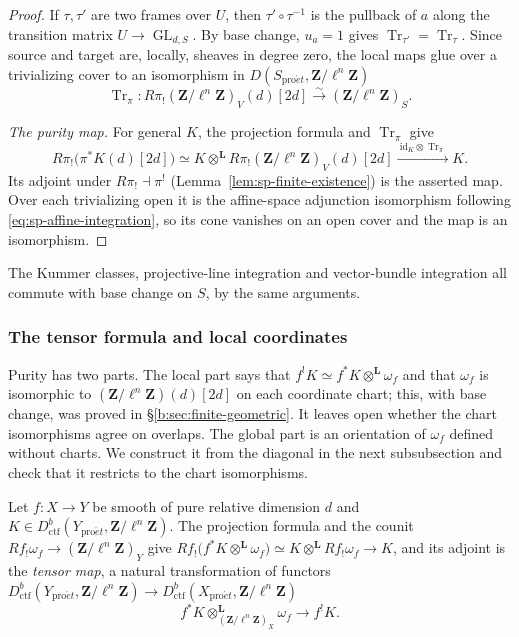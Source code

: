 \documentclass[11pt,a4paper]{article}
\numberwithin{equation}{section}
\theoremstyle{definition}
\theoremstyle{remark}
\newcommand{\proet}{\mathrm{pro}\acute{e}t}
\newcommand{\Dctf}{D^b_{\mathrm{ctf}}}
\DeclareMathOperator{\GL}{GL}
\begin{document}
\begin{proof}
If $\tau,\tau'$ are two frames over $U$, then $\tau'\circ\tau^{-1}$ is
the pullback of $a$ along the transition matrix $U\to\GL_{d,S}$. By
base change, $u_a=1$ gives $\operatorname{Tr}_{\tau'}=\operatorname{Tr}_{\tau}$.
Since source and target are, locally, sheaves in degree zero, the
local maps glue over a trivializing cover to an isomorphism in
$D(S_{\proet},\mathbf Z/\ell^n\mathbf Z)$
\[
 \operatorname{Tr}_{\pi}:
 R\pi_!(\mathbf Z/\ell^n\mathbf Z)_V(d)[2d]
       \xrightarrow{\sim}(\mathbf Z/\ell^n\mathbf Z)_S.
\]

\emph{The purity map.} For general $K$, the projection formula and
$\operatorname{Tr}_\pi$ give
\[
 R\pi_!\bigl(\pi^{*}K(d)[2d]\bigr)
 \simeq K\otimes^{\mathbf L} R\pi_!(\mathbf Z/\ell^n\mathbf Z)_V(d)[2d]
 \xrightarrow{\ \mathrm{id}_K\otimes\operatorname{Tr}_{\pi}\ }K.
\]
Its adjoint under $R\pi_!\dashv\pi^{!}$
(Lemma~\ref{lem:sp-finite-existence}) is the asserted map. Over each
trivializing open it is the affine-space adjunction isomorphism
following \eqref{eq:sp-affine-integration}, so its cone vanishes on an
open cover and the map is an isomorphism.
\end{proof}

The Kummer classes, projective-line integration and vector-bundle
integration all commute with base change on $S$, by the same arguments.

\subsubsection{The tensor formula and local coordinates}

Purity has two parts. The local part says that
$f^!K\simeq f^*K\otimes^{\mathbf L}\omega_f$ and that $\omega_f$ is
isomorphic to $(\mathbf Z/\ell^n\mathbf Z)(d)[2d]$ on each coordinate
chart; this, with base change, was proved in
\S\ref{b:sec:finite-geometric}. It leaves open whether the chart
isomorphisms agree on overlaps. The global part is an orientation of
$\omega_f$ defined without charts. We construct it from the diagonal in
the next subsubsection and check that it restricts to the chart
isomorphisms.

Let $f:X\to Y$ be smooth of pure relative dimension $d$ and
$K\in\Dctf(Y_{\proet},\mathbf Z/\ell^n\mathbf Z)$. The projection
formula and the counit $Rf_!\omega_{f}\to(\mathbf Z/\ell^n\mathbf Z)_{Y}$
give $Rf_!\bigl(f^{*}K\otimes^{\mathbf L}\omega_{f}\bigr)
\simeq K\otimes^{\mathbf L} Rf_!\omega_{f}\to K$, and its adjoint is
the \emph{tensor map}, a natural transformation of functors
$\Dctf(Y_{\proet},\mathbf Z/\ell^n\mathbf Z)\to
\Dctf(X_{\proet},\mathbf Z/\ell^n\mathbf Z)$
\begin{equation}\label{eq:sp-tensor-map}
 f^{*}K\otimes^{\mathbf L}_{(\mathbf Z/\ell^n\mathbf Z)_{X}}\omega_{f}
      \longrightarrow f^{!}K.
\end{equation}
\end{document}
